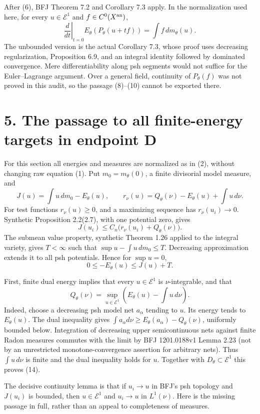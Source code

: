 \documentclass[11pt]{article}
\begin{document}
After (6), BFJ Theorem 7.2 and Corollary 7.3 apply. In the normalization used here, for every \(u\in\mathcal E^1\) and \(f\in C^0(X^{\rm an})\),
\[
 \left.\frac d{dt}\right|_{t=0}E_\theta(P_\theta(u+tf))
 =\int f\,dm_\theta(u).
 \tag{10}
\]
The unbounded version is the actual Corollary 7.3, whose proof uses decreasing regularization, Proposition 6.9, and an integral identity followed by dominated convergence. Mere differentiability along psh segments would not suffice for the Euler--Lagrange argument. Over a general field, continuity of \(P_\theta(f)\) was not proved in this audit, so the passage (8)--(10) cannot be exported there.

\section*{5. The passage to all finite-energy targets in endpoint D}

For this section all energies and measures are normalized as in (2), without changing raw equation (1). Put \(m_0=m_\theta(0)\), a finite divisorial model measure, and
\[
 J(u)=\int u\,dm_0-E_\theta(u),\qquad
 r_\nu(u)=Q_\theta(\nu)-E_\theta(u)+\int u\,d\nu.
 \tag{11}
\]
For test functions \(r_\nu(u)\geq0\), and a maximizing sequence has \(r_\nu(u_i)\to0\). Synthetic Proposition 2.2(2.7), with one potential zero, gives
\[
 J(u_i)\leq C_n\big(r_\nu(u_i)+Q_\theta(\nu)\big).
 \tag{12}
\]
The submean value property, synthetic Theorem 1.26 applied to the integral variety, gives \(T<\infty\) such that \(\sup u-\int u\,dm_0\leq T\). Decreasing approximation extends it to all psh potentials. Hence for \(\sup u=0\),
\[
 0\leq-E_\theta(u)\leq J(u)+T.
 \tag{13}
\]

First, finite dual energy implies that every \(u\in\mathcal E^1\) is \(\nu\)-integrable, and that
\[
 Q_\theta(\nu)=\sup_{u\in\mathcal E^1}
 \left(E_\theta(u)-\int u\,d\nu\right).
 \tag{14}
\]
Indeed, choose a decreasing psh model net \(a_\alpha\) tending to \(u\). Its energy tends to \(E_\theta(u)\). The dual inequality gives \(\int a_\alpha d\nu\geq E_\theta(a_\alpha)-Q_\theta(\nu)\), uniformly bounded below. Integration of decreasing upper semicontinuous nets against finite Radon measures commutes with the limit by BFJ 1201.0188v1 Lemma 2.23 (not by an unrestricted monotone-convergence assertion for arbitrary nets). Thus \(\int u\,d\nu\) is finite and the dual inequality holds for \(u\). Together with \(D_\theta\subset\mathcal E^1\) this proves (14).

The decisive continuity lemma is that if \(u_i\to u\) in BFJ's psh topology and \(J(u_i)\) is bounded, then \(u\in\mathcal E^1\) and \(u_i\to u\) in \(L^1(\nu)\). Here is the missing passage in full, rather than an appeal to completeness of measures.
\end{document}
